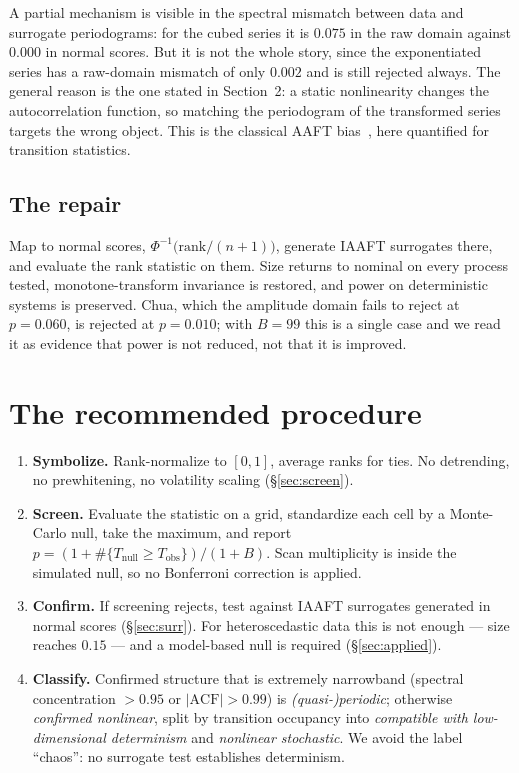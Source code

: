 \documentclass[11pt]{article}
\begin{document}
A partial mechanism is visible in the spectral mismatch between data and
surrogate periodograms: for the cubed series it is $0.075$ in the raw domain
against $0.000$ in normal scores. But it is not the whole story, since the
exponentiated series has a raw-domain mismatch of only $0.002$ and is still
rejected always. The general reason is the one stated in Section~2: a static
nonlinearity changes the autocorrelation function, so matching the periodogram
of the transformed series targets the wrong object. This is the classical AAFT
bias~\cite{kugiumtzis,schreiber2000}, here quantified for transition statistics.

\subsection{The repair}

Map to normal scores, $\Phi^{-1}\!\big(\mathrm{rank}/(n+1)\big)$, generate IAAFT
surrogates there, and evaluate the rank statistic on them. Size returns to nominal on every process tested, monotone-transform invariance
is restored, and power on deterministic systems is preserved. Chua, which the
amplitude domain fails to reject at $p=0.060$, is rejected at $p=0.010$; with
$B=99$ this is a single case and we read it as evidence that power is not
reduced, not that it is improved.

\section{The recommended procedure}
\label{sec:proc}

\begin{enumerate}[leftmargin=*,nosep]
\item \textbf{Symbolize.} Rank-normalize to $[0,1]$, average ranks for ties. No
detrending, no prewhitening, no volatility scaling (\S\ref{sec:screen}).
\item \textbf{Screen.} Evaluate the statistic on a grid, standardize each cell
by a Monte-Carlo null, take the maximum, and report
$p=(1+\#\{T_{\text{null}}\ge T_{\text{obs}}\})/(1+B)$. Scan multiplicity is
inside the simulated null, so no Bonferroni correction is applied.
\item \textbf{Confirm.} If screening rejects, test against IAAFT surrogates
generated in normal scores (\S\ref{sec:surr}). For heteroscedastic data this is
not enough --- size reaches $0.15$ --- and a model-based null is required
(\S\ref{sec:applied}).
\item \textbf{Classify.} Confirmed structure that is extremely narrowband
(spectral concentration $>0.95$ or $|\mathrm{ACF}|>0.99$) is
\emph{(quasi-)periodic}; otherwise \emph{confirmed nonlinear}, split by
transition occupancy into \emph{compatible with low-dimensional determinism} and
\emph{nonlinear stochastic}. We avoid the label ``chaos'': no surrogate test
establishes determinism.
\end{enumerate}
\end{document}
